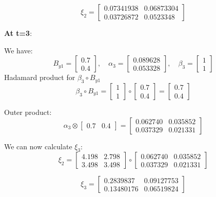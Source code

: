 \[ 
\xi_2 = \begin{bmatrix}
    0.07341938 & 0.06873304 \\ 0.03726872 & 0.0523348
\end{bmatrix}
\]

\textbf{At t=3}:

We have:
\[
B_{y1} = \begin{bmatrix}
    0.7 \\ 0.4
\end{bmatrix}, \quad \alpha_3 = \begin{bmatrix}
    0.089628 \\ 0.053328
\end{bmatrix}, \quad \beta_3 = \begin{bmatrix}
    1 \\ 1
\end{bmatrix}
\]
Hadamard product for $\beta_3 \circ B_{y1}$
\[
\beta_3 \circ B_{y1} = \begin{bmatrix}
    1 \\ 1
\end{bmatrix} \circ \begin{bmatrix}
    0.7 \\ 0.4
\end{bmatrix} = \begin{bmatrix}
    0.7 \\ 0.4
\end{bmatrix}
\]

Outer product:
\[
\alpha_3 \otimes \begin{bmatrix}
    0.7 & 0.4
\end{bmatrix} = \begin{bmatrix}
    0.062740 & 0.035852 \\ 0.037329 & 0.021331
\end{bmatrix}
\]

We can now calculate $\xi_3$:
\[
\xi_2 = 
\begin{bmatrix}
    4.198 & 2.798 \\ 3.498 & 3.498
\end{bmatrix} \circ \begin{bmatrix}
    0.062740 & 0.035852 \\ 0.037329 & 0.021331
\end{bmatrix} 
\] 

\[ \xi_3 = \begin{bmatrix}
    0.2839837 & 0.09127753 \\ 0.13480176 & 0.06519824
\end{bmatrix}
\]


